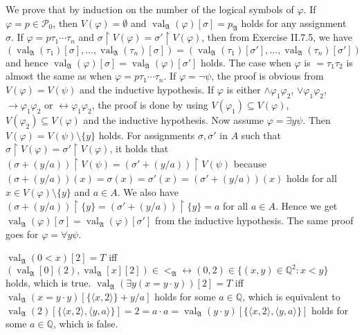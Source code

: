 \documentclass[12pt]{article}
\newcommand{\val}{\mathop{\mathrm{val}}}
\theoremstyle{definition}
\newenvironment{customthm}[1]
  {\renewcommand\theinnercustomthm{#1}\innercustomthm}
  {\endinnercustomthm}
\begin{document}
\begin{customthm}{II.7.9} We prove that by induction on the number of the logical symbols of $\varphi$. If $\varphi=p\in\mathcal{P}_0$, then $V(\varphi)=\emptyset$ and $\val_\mathfrak{A}(\varphi)[\sigma]=p_\mathfrak{A}$ holds for any assignment $\sigma$. If $\varphi=p\tau_1\cdots\tau_n$ and $\sigma\upharpoonright V(\varphi)=\sigma'\upharpoonright V(\varphi)$, then from Exercise II.7.5, we have $(\val_\mathfrak{A}(\tau_1)[\sigma],\ldots,\val_\mathfrak{A}(\tau_n)[\sigma])=(\val_\mathfrak{A}(\tau_1)[\sigma'],\ldots,\val_\mathfrak{A}(\tau_n)[\sigma'])$ and hence $\val_\mathfrak{A}(\varphi)[\sigma]=\val_\mathfrak{A}(\varphi)[\sigma']$ holds. The case when $\varphi$ is $=\tau_1\tau_2$ is almost the same as when $\varphi=p\tau_1\cdots\tau_n$. If $\varphi=\neg\psi$, the proof is obvious from $V(\varphi)=V(\psi)$ and the inductive hypothesis. If $\varphi$ is either $\wedge\varphi_1\varphi_2$, $\vee\varphi_1\varphi_2$, $\rightarrow\varphi_1\varphi_2$ or $\leftrightarrow\varphi_1\varphi_2$, the proof is done by using $V(\varphi_1)\subseteq V(\varphi)$, $V(\varphi_2)\subseteq V(\varphi)$ and the inductive hypothesis. Now assume $\varphi=\exists y\psi$. Then $V(\varphi)=V(\psi)\setminus\{y\}$ holds. For assignments $\sigma,\sigma'$ in $A$ such that $\sigma\upharpoonright V(\varphi)=\sigma'\upharpoonright V(\varphi)$, it holds that $(\sigma+(y/a))\upharpoonright V(\psi)=(\sigma'+(y/a))\upharpoonright V(\psi)$ because $(\sigma+(y/a))(x)=\sigma(x)=\sigma'(x)=(\sigma'+(y/a))(x)$ holds for all $x\in V(\varphi)\setminus\{y\}$ and $a\in A$. We also have $(\sigma+(y/a))\upharpoonright\{y\}=(\sigma'+(y/a))\upharpoonright\{y\}=a$ for all $a\in A$. Hence we get $\val_\mathfrak{A}(\varphi)[\sigma]=\val_\mathfrak{A}(\varphi)[\sigma']$ from the inductive hypothesis. The same proof goes for $\varphi=\forall y\psi$.
\end{customthm}

\begin{customthm}{II.7.10} $\val_\mathfrak{A}(0<x)[2]=T$ iff $(\val_\mathfrak{A}[0](2), \val_\mathfrak{A}[x][2])\in<_\mathfrak{A}\leftrightarrow(0,2)\in\{(x,y)\in\mathbb{Q}^2:x<y\}$ holds, which is true. $\val_\mathfrak{A}(\exists y(x=y\cdot y))[2]=T$ iff $\val_\mathfrak{A}(x=y\cdot y)[\{\langle x,2\rangle\}+y/a]$ holds for some $a\in\mathbb{Q}$, which is equivalent to $\val_\mathfrak{A}(2)[\{\langle x,2\rangle,\langle y,a\rangle\}]=2=a\cdot a=\val_\mathfrak{A}(y\cdot y)[\{\langle x,2\rangle,\langle y,a\rangle\}]$ holds for some $a\in\mathbb{Q}$, which is false.
\end{customthm}
\end{document}
